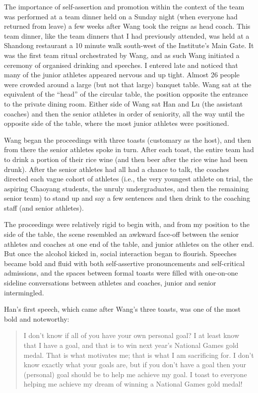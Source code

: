 \begin{CJK}{UTF8}{gbsn}
  The importance of self-assertion and promotion within the context of the team was performed at a team dinner held on a Sunday night (when everyone had returned from leave) a few weeks after Wang took the reigns as head coach.  This team dinner, like the team dinners that I had previously attended, was held at a Shandong restaurant a 10 minute walk south-west of the Institute's Main Gate.  It was the first team ritual orchestrated by Wang, and as such Wang initiated a ceremony of organised drinking and speeches.  I entered late and noticed that many of the junior athletes appeared nervous and up tight. Almost 26 people were crowded around a large (but not that large) banquet table.  Wang sat at the equivalent of the ``head'' of the circular table, the position opposite the entrance to the private dining room.  Either side of Wang sat Han and Lu (the assistant coaches) and then the senior athletes in order of seniority, all the way until the opposite side of the table, where the most junior athletes were positioned.

  Wang began the proceedings with three toasts (customary as the host), and then from there the senior athletes spoke in turn.  After each toast, the entire team had to drink a portion of their rice wine (and then beer after the rice wine had been drunk).  After the senior athletes had all had a chance to talk, the coaches directed each vague cohort of athletes (i.e., the very youngest athlete on trial, the aspiring Chaoyang students, the unruly undergraduates, and then the remaining senior team) to stand up and say a few sentences and then drink to the coaching staff (and senior athletes).

  The proceedings were relatively rigid to begin with, and from my position to the side of the table, the scene resembled an awkward face-off between the senior athletes and coaches at one end of the table, and junior athletes on the other end.  But once the alcohol kicked in, social interaction began to flourish. Speeches became bold and fluid with both self-assertive pronouncements and self-critical admissions, and the spaces between formal toasts were filled with one-on-one sideline conversations between athletes and coaches, junior and senior intermingled.

  Han's first speech, which came after Wang's three toasts, was one of the most bold and noteworthy:

  \begin{quotation}
    I don’t know if all of you have your own personal goal?  I at least know that I have a goal, and that is to win next year’s National Games gold medal.  That is what motivates me; that is what I am sacrificing for.  I don’t know exactly what your goals are, but if you don't have a goal then your (personal) goal should be to help me achieve my goal.  I toast to everyone helping me achieve my dream of winning a National Games gold medal!
  \end{quotation}



\end{CJK}
